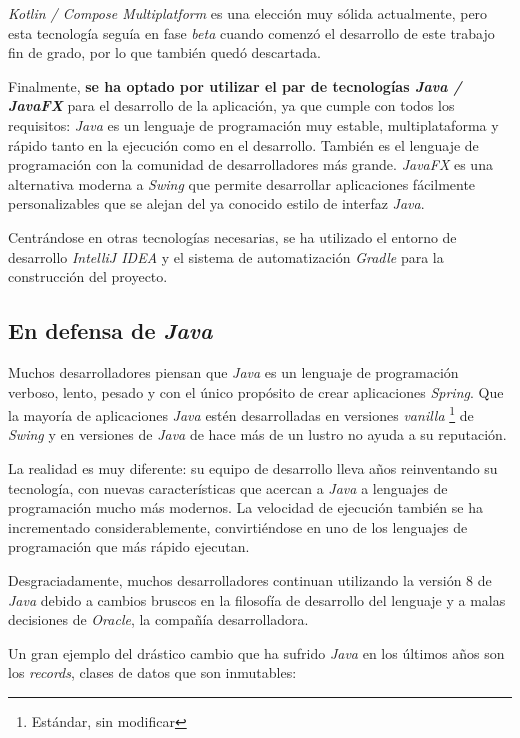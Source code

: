 \textit{Kotlin / Compose Multiplatform} es una elección muy sólida actualmente,
pero esta tecnología seguía en fase \textit{beta} cuando comenzó el desarrollo
de este trabajo fin de grado, por lo que también quedó descartada.

Finalmente, \textbf{se ha optado por utilizar el par de tecnologías \textit{Java / JavaFX}}
para el desarrollo de la aplicación, ya que cumple con todos los requisitos: \textit{Java} es un
lenguaje de programación muy estable, multiplataforma y rápido tanto en la ejecución como en
el desarrollo.
También es el lenguaje de programación con la comunidad de desarrolladores más grande.
\textit{JavaFX} es una alternativa moderna a \textit{Swing} que permite desarrollar aplicaciones
fácilmente personalizables que se alejan del ya conocido estilo de interfaz \textit{Java}.

Centrándose en otras tecnologías necesarias, se ha utilizado el entorno de desarrollo
\textit{IntelliJ IDEA}\cite{INTELLIJIDEA} y el sistema de
automatización \textit{Gradle} para la construcción del proyecto.

\subsection{En defensa de \textit{Java}}\label{subsec:en-defensa-de-java}

Muchos desarrolladores piensan que \textit{Java} es un lenguaje de programación verboso, lento, pesado
y con el único propósito de crear aplicaciones \textit{Spring}.
Que la mayoría de aplicaciones \textit{Java} estén desarrolladas en versiones \textit{vanilla}
\footnote{Estándar, sin modificar} de \textit{Swing} y en versiones de \textit{Java} de hace más
de un lustro no ayuda a su reputación.

La realidad es muy diferente: su equipo de desarrollo lleva años
reinventando su tecnología, con nuevas características que acercan a
\textit{Java} a lenguajes de programación mucho más modernos. La
velocidad de ejecución también se ha incrementado considerablemente,
convirtiéndose en uno de los lenguajes de programación que más rápido
ejecutan.

Desgraciadamente, muchos desarrolladores continuan
utilizando la versión 8 de \textit{Java} debido a cambios bruscos en
la filosofía de desarrollo del lenguaje y a malas decisiones de
\textit{Oracle}, la compañía desarrolladora.

Un gran ejemplo del drástico cambio que ha sufrido \textit{Java} en los últimos años son los
\textit{records}, clases de datos que son inmutables:

